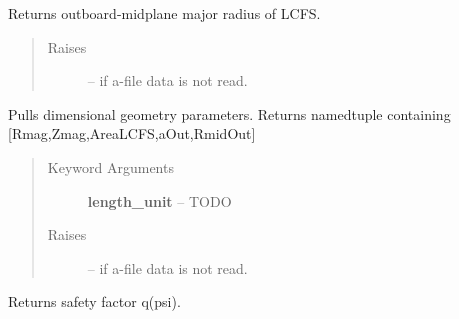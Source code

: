 \documentclass[letterpaper,10pt,english]{sphinxmanual}
\begin{document}
\begin{fulllineitems}
\begin{fulllineitems}
\begin{quote}
\begin{description}
\end{description}\end{quote}

\end{fulllineitems}


\begin{fulllineitems}
\label{eqtools:eqtools.eqdskreader.EqdskReader.getRmidOut}
Returns outboard-midplane major radius of LCFS.
\begin{quote}\begin{description}
\item[{Raises }] \leavevmode
{} -- 
if a-file data is not read.

\end{description}\end{quote}

\end{fulllineitems}


\begin{fulllineitems}
\label{eqtools:eqtools.eqdskreader.EqdskReader.getGeometry}
Pulls dimensional geometry parameters.
Returns namedtuple containing {[}Rmag,Zmag,AreaLCFS,aOut,RmidOut{]}
\begin{quote}\begin{description}
\item[{Keyword Arguments}] \leavevmode
\textbf{length\_unit} --
TODO

\item[{Raises }] \leavevmode
{} -- 
if a-file data is not read.

\end{description}\end{quote}

\end{fulllineitems}


\begin{fulllineitems}
\label{eqtools:eqtools.eqdskreader.EqdskReader.getQProfile}
Returns safety factor q(psi).

\end{fulllineitems}


\end{fulllineitems}
\end{document}
